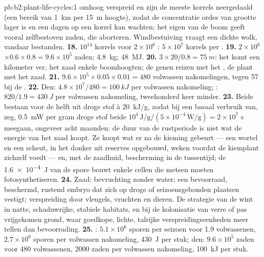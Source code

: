 \begin{solution}{pb:b2:plant-life-cycles:1}
omhoog verspreid en zijn de meeste korrels neergedaald (een bereik van
\qty{1}{km} per \qty{15}{m} hoogte), zodat de concentratie ordes van
grootte lager is en een  dagen op een korrel kan wachten; het
eigen  van de boom geeft vooral zelfbestoven zaden, die aborteren.
Windbestuiving vraagt een dichte wolk, vandaar bestanden.
\textbf{18.} $10^{14}$ korrels voor $2\times 10^{6}$ : $5\times
10^{7}$ korrels per .
\textbf{19.} $2\times 10^{6}$  $\times 0.6\times 0.8 = 9.6\times
10^{5}$ zaden; \qty{4.8}{kg}; \qty{48}{MJ}.
\textbf{20.} $3\times 20/0.8 = \qty{75}{m}$: het  komt een
kilometer ver, het zaad enkele boomhoogten; de genen reizen met het
, de plant met het zaad.
\textbf{21.} $9.6\times 10^{5}\times 0.05\times 0.01 = 480$ volwassen
nakomelingen, tegen 57 bij de .
\textbf{22.} Den: $4.8\times 10^{7}/480 = \qty{100}{kJ}$ per volwassen
nakomeling; : $820/1.9 = \qty{430}{J}$ per volwassen nakomeling,
tweehonderd keer minder.
\textbf{23.} Beide bestaan voor de helft uit droge stof à \qty{20}{kJ/g},
zodat bij een basaal verbruik van, zeg, \qty{0.5}{mW} per gram droge stof
beide $10^{4}\,
\text{J/g}/(5\times 10^{-4}\,\text{W/g}) = 2\times 10^{7}$ s meegaan,
ongeveer acht maanden: de duur van de rustperiode is niet wat de energie
van het zaad koopt. Ze koopt wat er na de kieming gebeurt --- een wortel
en een scheut, in het donker uit reserves opgebouwd, weken voordat de
kiemplant zichzelf voedt --- en, met de zaadhuid, bescherming in de
tussentijd; de \qty{1.6e-4}{J} van de spore bouwt enkele cellen die
meteen moeten fotosynthetiseren.
\textbf{24.} Zaad: bevruchting zonder water; een bevoorraad, beschermd,
rustend embryo dat zich op droge of seizoensgebonden plaatsen vestigt;
verspreiding door vleugels, vruchten en dieren. De strategie van de 
wint in natte, schaduwrijke, stabiele habitats, en bij de kolonisatie van
verre of pas vrijgekomen grond, waar goedkope, lichte, talrijke
verspreidingseenheden meer tellen dan bevoorrading.
\textbf{25.} : $5.1\times 10^{6}$ sporen per seizoen voor 1.9
volwassenen, $2.7\times 10^{6}$ sporen per volwassen nakomeling,
\qty{430}{J} per stuk; den: $9.6\times 10^{5}$ zaden voor 480 volwassenen,
\num{2000} zaden per volwassen nakomeling, \qty{100}{kJ} per stuk.
\end{solution}

